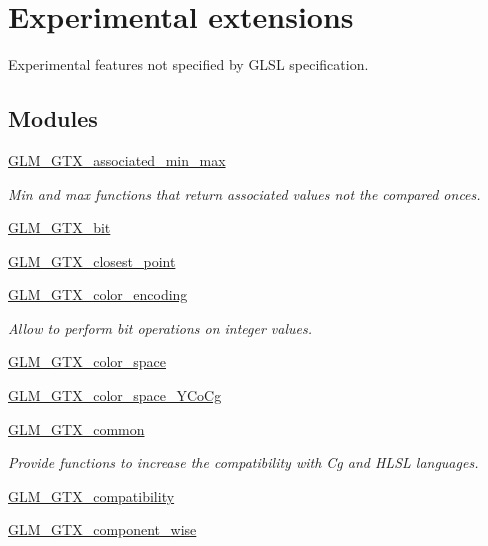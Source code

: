 \hypertarget{group__gtx}{}\section{Experimental extensions}
\label{group__gtx}


Experimental features not specified by G\+L\+SL specification.  


\subsection*{Modules}
\begin{DoxyCompactItemize}
\item 
\hyperlink{group__gtx__associated__min__max}{G\+L\+M\+\_\+\+G\+T\+X\+\_\+associated\+\_\+min\+\_\+max}
\begin{DoxyCompactList}\small\item\em Min and max functions that return associated values not the compared onces. \end{DoxyCompactList}\item 
\hyperlink{group__gtx__bit}{G\+L\+M\+\_\+\+G\+T\+X\+\_\+bit}
\item 
\hyperlink{group__gtx__closest__point}{G\+L\+M\+\_\+\+G\+T\+X\+\_\+closest\+\_\+point}
\item 
\hyperlink{group__gtx__color__encoding}{G\+L\+M\+\_\+\+G\+T\+X\+\_\+color\+\_\+encoding}
\begin{DoxyCompactList}\small\item\em Allow to perform bit operations on integer values. \end{DoxyCompactList}\item 
\hyperlink{group__gtx__color__space}{G\+L\+M\+\_\+\+G\+T\+X\+\_\+color\+\_\+space}
\item 
\hyperlink{group__gtx__color__space___y_co_cg}{G\+L\+M\+\_\+\+G\+T\+X\+\_\+color\+\_\+space\+\_\+\+Y\+Co\+Cg}
\item 
\hyperlink{group__gtx__common}{G\+L\+M\+\_\+\+G\+T\+X\+\_\+common}
\begin{DoxyCompactList}\small\item\em Provide functions to increase the compatibility with Cg and H\+L\+SL languages. \end{DoxyCompactList}\item 
\hyperlink{group__gtx__compatibility}{G\+L\+M\+\_\+\+G\+T\+X\+\_\+compatibility}
\item 
\hyperlink{group__gtx__component__wise}{G\+L\+M\+\_\+\+G\+T\+X\+\_\+component\+\_\+wise}

\end{DoxyCompactItemize}
